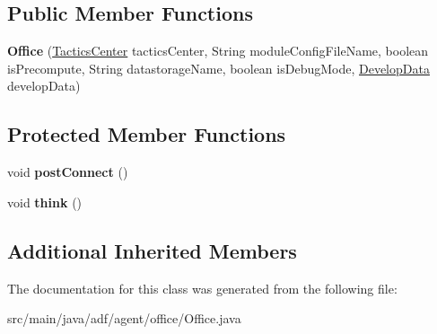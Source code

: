 \subsection*{Public Member Functions}
\begin{DoxyCompactItemize}
\item 
\hypertarget{classadf_1_1agent_1_1office_1_1Office_a88463c6e25b26ebb843f9f1355fc397e}{}\label{classadf_1_1agent_1_1office_1_1Office_a88463c6e25b26ebb843f9f1355fc397e} 
{\bfseries Office} (\hyperlink{classadf_1_1component_1_1tactics_1_1center_1_1TacticsCenter}{Tactics\+Center} tactics\+Center, String module\+Config\+File\+Name, boolean is\+Precompute, String datastorage\+Name, boolean is\+Debug\+Mode, \hyperlink{classadf_1_1agent_1_1develop_1_1DevelopData}{Develop\+Data} develop\+Data)
\end{DoxyCompactItemize}
\subsection*{Protected Member Functions}
\begin{DoxyCompactItemize}
\item 
\hypertarget{classadf_1_1agent_1_1office_1_1Office_a501ed865cdd1e754940ba5dfc10484f3}{}\label{classadf_1_1agent_1_1office_1_1Office_a501ed865cdd1e754940ba5dfc10484f3} 
void {\bfseries post\+Connect} ()
\item 
\hypertarget{classadf_1_1agent_1_1office_1_1Office_aa101ca935dd000ff85b1f31733e9bd9e}{}\label{classadf_1_1agent_1_1office_1_1Office_aa101ca935dd000ff85b1f31733e9bd9e} 
void {\bfseries think} ()
\end{DoxyCompactItemize}
\subsection*{Additional Inherited Members}


The documentation for this class was generated from the following file\+:\begin{DoxyCompactItemize}
\item 
src/main/java/adf/agent/office/Office.\+java\end{DoxyCompactItemize}
